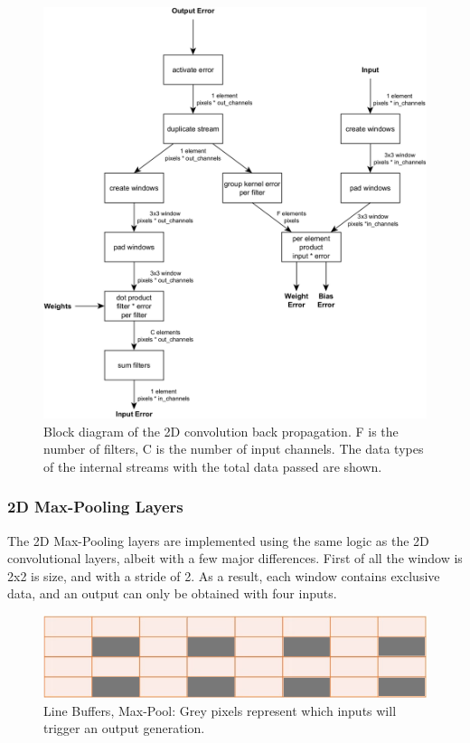 \begin{figure}[H]
    \centering
        \includegraphics[width=1\textwidth]{Images/block_diagrams/conv2d_bp_cg_mc.png}
        \decoRule
        \caption[Conv2D back propagation block diagram]{Block diagram of the 2D convolution back propagation. F is the number of filters, C is the number of input channels. The data types of the internal streams with the total data passed are shown. }
        \label{fig: Conv2D back propagation block diagram}
\end{figure}

\subsubsection{2D Max-Pooling Layers}
The 2D Max-Pooling layers are implemented using the same logic as the 2D convolutional layers, albeit with a few major differences. First of all the window is 2x2 is size, and with a stride of 2. As a result, each window contains exclusive data, and an output can only be obtained with four inputs.

\begin{figure}[H]
    \centering
        \includegraphics[width=1\textwidth]{Images/diagrams/line_buf_maxp.png}
        \decoRule
        \caption[Line Buffers, Max-Pool]{Line Buffers, Max-Pool: Grey pixels represent which inputs will trigger an output generation.}
        \label{fig: Line Buffers Max-Pool}
\end{figure}

